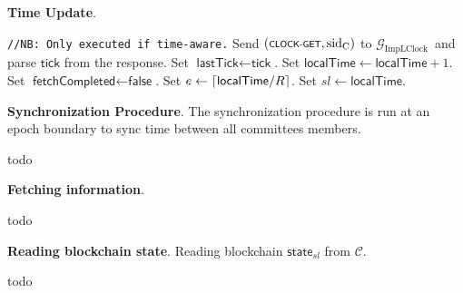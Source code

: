 \textbf{Time Update}.\label{apndx:update-time-protocol}
\begin{protocol}
    \caption{$\textsf{UpdateTime}(P, R)$}
    \begin{algorithmic}[1]
        \noindent
        \lstinline|//NB: Only executed if time-aware.|
        \State Send $(\textsf{\scriptsize{CLOCK-GET}}, \text{sid}_\text{C})$ to $\mathcal{G}_{\text{ImpLClock}}$\
        and parse $\textsf{tick}$ from the response.
            \State Set $\textsf{lastTick} \leftarrow \textsf{tick}$.
            \State Set $\textsf{localTime} \leftarrow \textsf{localTime} + 1$.
            \State Set $\textsf{fetchCompleted} \leftarrow \textsf{false}$.
        \EndIf
        \State Set $e \leftarrow \lceil \textsf{localTime}/\\R \rceil$.
        \State Set $sl \leftarrow \textsf{localTime}$.

    \end{algorithmic}\label{alg:update-time-protocol}
\end{protocol}

\bigbreak
\bigbreak
\noindent
{}
\textbf{Synchronization Procedure}.\label{apndx:sync-proc}
The synchronization procedure is run at an epoch boundary to sync time between all committees members.
\begin{protocol}
    \caption{$\textsf{SyncProc}(P, \text{sid}, R)$}
    \begin{algorithmic}[1]

        todo
    \end{algorithmic}\label{alg:sync-proc}
\end{protocol}

\bigbreak
\bigbreak
\noindent
{}
\textbf{Fetching information}.\label{apndx:fetch-info-protocol}
\begin{protocol}
    \caption{$\textsf{FetchInformation}(P, \text{sid})$}
    \begin{algorithmic}[1]

        todo
    \end{algorithmic}\label{alg:fetch-info-protocol}
\end{protocol}

\bigbreak
\bigbreak
\noindent
{}
\textbf{Reading blockchain state}.\label{apndx:read-state-protocol}
Reading blockchain $\textsf{state}_{sl}$ from  $\mathcal{C}$.
\begin{protocol}
    \caption{$\textsf{ReadState}(P, \text{sid}, sl, R, K_{\text{f}}, \mathcal{C})$}
    \begin{algorithmic}[1]

        todo
    \end{algorithmic}\label{alg:read-state-protocol}
\end{protocol}

